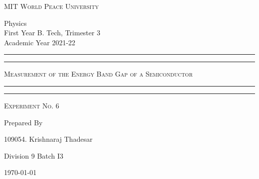 \documentclass[12pt]{article}
\begin{document}
	
	\begin{titlepage} 
		\centering 
		
		
		\huge\textsc{
			MIT World Peace University
		}\\
	
		\vspace{0.75\baselineskip} %
		
		\LARGE{
			Physics\\
			First Year B. Tech, Trimester 3\\
			Academic Year 2021-22
		}
		
		\vfill %
		
		
		\rule{\textwidth}{1.6pt}\vspace*{-\baselineskip}\vspace*{2pt}
		\rule{\textwidth}{0.6pt}
		\vspace{0.75\baselineskip} %
		
		
		
		\huge{\textsc{
				Measurement of the Energy Band Gap of a Semiconductor
			}} \\
		
		
		
		\vspace{0.5\baselineskip} %
		\rule{\textwidth}{0.6pt}\vspace*{-\baselineskip}\vspace*{2.8pt}
		\rule{\textwidth}{1.6pt}
		
		\vspace{1\baselineskip} %

			
		\LARGE\textsc{
			Experiment No. 6
		} %
		\vfill
		
		
		Prepared By
		\vspace{0.5\baselineskip} %
		
		\Large{
			109054. Krishnaraj Thadesar
			
			Division 9 Batch I3
		}
		
		
		\vspace{0.5\baselineskip} %
		\today

	\end{titlepage}
\end{document}
